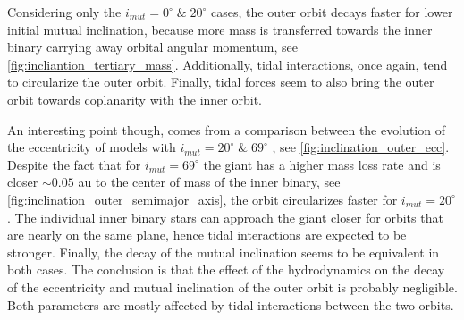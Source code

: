 Considering only the $i_{mut} = 0^{\circ} \; \&  \; 20^{\circ}$ cases, the outer orbit decays faster for lower initial mutual inclination, because more mass is transferred towards the inner binary carrying away orbital angular momentum, see \cref{fig:incliantion_tertiary_mass}. Additionally, tidal interactions, once again, tend to circularize the outer orbit. Finally, tidal forces seem to also bring the outer orbit towards coplanarity with the inner orbit. 

An interesting point though, comes from a comparison between the evolution of the eccentricity of models with $i_{mut} = 20^{\circ} \; \&  \; 69^{\circ}$ , see \cref{fig:inclination_outer_ecc}. Despite the fact that for $i_{mut} = 69^{\circ}$ the giant has a higher mass loss rate and is closer $\sim 0.05$ au to the center of mass of the inner binary, see \cref{fig:inclination_outer_semimajor_axis}, the orbit circularizes faster for $i_{mut} = 20^{\circ}$. The individual inner binary stars can approach the giant closer for orbits that are nearly on the same plane, hence tidal interactions are expected to be stronger. Finally, the decay of the mutual inclination seems to be equivalent in both cases. The conclusion is that the effect of the hydrodynamics on the decay of the eccentricity and mutual inclination of the outer orbit is probably negligible. Both parameters are mostly affected by tidal interactions between the two orbits.

